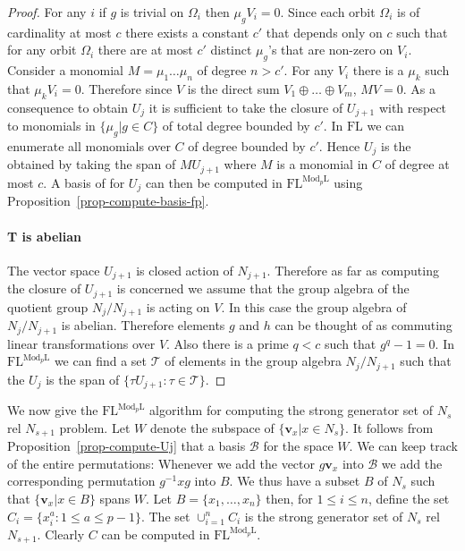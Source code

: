 \documentclass[11pt]{madras}%
\theoremstyle{remark}
\newcommand{\ModkL}[1]{{\ensuremath{\mathrm{Mod}_{#1}\mathrm{L}}}}
\begin{document}
\begin{proof}
  For any $i$ if $g$ is trivial on $\Omega_i$ then $\mu_g V_i = 0$.
  Since each orbit $\Omega_i$ is of cardinality at most $c$ there
  exists a constant $c'$ that depends only on $c$ such that for any
  orbit $\Omega_i$ there are at most $c'$ distinct $\mu_g$'s that are
  non-zero on $V_i$.  Consider a monomial $M = \mu_1 \ldots \mu_n$ of
  degree $n > c'$. For any $V_i$ there is a $\mu_k$ such that $\mu_k
  V_i = 0$. Therefore since $V$ is the direct sum $V_1 \oplus \ldots
  \oplus V_m$, $MV = 0$.  As a consequence to obtain $U_j$ it is
  sufficient to take the closure of $U_{j+1}$ with respect to
  monomials in $\{ \mu_g | g \in C \}$ of total degree bounded by
  $c'$. In $\mathrm{FL}$ we can enumerate all monomials over $C$ of
  degree bounded by $c'$.  Hence $U_j$ is the obtained by taking the
  span of $MU_{j+1}$ where $M$ is a monomial in $C$ of degree at most
  $c$. A basis of for $U_j$ can then be computed in
  $\mathrm{FL}^{\ModkL{p}}$ using
  Proposition~\ref{prop-compute-basis-fp}.

  \paragraph{T is abelian}
  The vector space $U_{j+1}$ is closed action of $N_{j+1}$. Therefore
  as far as computing the closure of $U_{j+1}$ is concerned we assume
  that the group algebra of the quotient group $N_j/N_{j+1}$ is acting
  on $V$.  In this case the  group algebra of $N_j/N_{j+1}$ is
  abelian.  Therefore elements $g$ and $h$ can be thought of as
  commuting linear transformations over $V$. Also there is a prime $q
  < c$ such that $g^q -1 = 0$. In $\mathrm{FL}^{\ModkL{p}}$ we can
  find a set $\mathcal{T}$ of elements in the group algebra
  $N_j/N_{j+1}$ such that the $U_j$ is the span of $\{ \tau U_{j+1} :
  \tau \in \mathcal{T} \}$.
\end{proof}

We now give the $\mathrm{FL}^{\ModkL{p}}$ algorithm for computing the
strong generator set of $N_s$ rel $N_{s+1}$ problem.  Let $W$ denote
the subspace of $\{ \mathbf{v}_x | x \in N_s \}$. It follows from
Proposition~\ref{prop-compute-Uj} that a basis $\mathcal{B}$ for the
space $W$. We can keep track of the entire permutations: Whenever we
add the vector $g \mathbf{v}_x$ into $\mathcal{B}$ we add the
corresponding permutation $g^{-1} x g$ into $B$. We thus have a subset
$B$ of $N_s$ such that $\{ \mathbf{v}_x | x \in B \}$ spans $W$.  Let
$B = \{x_1,\ldots,x_n \}$ then, for $1 \leq i \leq n$, define the set
$C_i = \{ x_i^a : 1 \leq a \leq p -1 \}$.  The set $\cup_{i=1}^n C_i$
is the strong generator set of $N_s$ rel $N_{s+1}$. Clearly $C$ can be
computed in $\mathrm{FL}^{\ModkL{p}}$.
\end{document}

